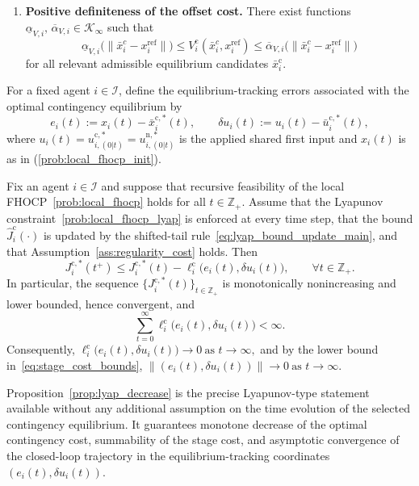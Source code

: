 \documentclass[twocolumn]{autart}
\begin{document}
\begin{assumption}
\begin{enumerate}
    \item \textbf{Positive definiteness of the offset cost.}
    There exist functions
    \(
    \underline{\alpha}_{V,i},\,\overline{\alpha}_{V,i}\in\mathcal K_\infty
    \)
    such that
    \[
    \underline{\alpha}_{V,i}\!\bigl(\|\bar{x}_i^c- x_i^{\mathrm{ref}}\|\bigr)
    \le
    V_i^{\mathrm c}(\bar{x}_i^c,x_i^{\mathrm{ref}})
    \le
    \overline{\alpha}_{V,i}\!\bigl(\|\bar{x}_i^c- x_i^{\mathrm{ref}}\|\bigr)
    \]
    for all relevant admissible equilibrium candidates $\bar x_i^{\mathrm c}$.
\end{enumerate}
\end{assumption}
For a fixed agent \(i\in\mathcal I\), define the equilibrium-tracking
errors associated with the optimal contingency equilibrium by
\[
e_i(t):=x_i(t)-\bar x_i^{\mathrm c,\ast}(t),
\qquad
\delta u_i(t):=u_i(t)-\bar u_i^{\mathrm c,\ast}(t),
\]
where
\(
u_i(t)=u_{i,(0|t)}^{\mathrm c,\ast}
      =u_{i,(0|t)}^{\mathrm n,\ast}
\)
is the applied shared first input and $x_i(t)$ is as in (\ref{prob:local_fhocp_init}).
\begin{proposition}%
\label{prop:lyap_decrease}
Fix an agent \(i\in\mathcal I\) and suppose that recursive feasibility of
the local FHOCP~\eqref{prob:local_fhocp} holds for all
\(t\in\mathbb Z_+\). Assume that the Lyapunov
constraint~\eqref{prob:local_fhocp_lyap} is enforced at every time step,
that the bound \(\hat J_i^{\mathrm c}(\cdot)\) is updated by the
shifted-tail rule~\eqref{eq:lyap_bound_update_main}, and that
Assumption~\ref{ass:regularity_cost} holds. Then
\begin{equation}
J_i^{\mathrm c,\ast}(t^+)
\le
J_i^{\mathrm c,\ast}(t)
-
\ell_i^{\mathrm c}\!\bigl(e_i(t),\delta u_i(t)\bigr),
\qquad \forall t\in\mathbb Z_+.
\label{eq:lyap_decrease_main}
\end{equation}
In particular, the sequence $\{J_i^{\mathrm c,\ast}(t)\}_{t\in\mathbb Z_+}$ is monotonically nonincreasing and lower bounded, hence convergent, and
\begin{equation}
\sum_{t=0}^{\infty}
\ell_i^{\mathrm c}\!\bigl(e_i(t),\delta u_i(t)\bigr)
<\infty.
\label{eq:summable_stage_main}
\end{equation}
Consequently,
\(
\ell_i^{\mathrm c}\!\bigl(e_i(t),\delta u_i(t)\bigr)\to 0
\ \text{as } t\to\infty,
\)
and by the lower bound in~\eqref{eq:stage_cost_bounds},
\(
\|(e_i(t),\delta u_i(t))\|\to 0
\ \text{as } t\to\infty.
\)
\end{proposition}
\begin{remark}
\label{rem:prop_lyap_interpretation}
Proposition~\ref{prop:lyap_decrease} is the precise Lyapunov-type statement available without any additional assumption on the time evolution of the selected contingency equilibrium.
It guarantees monotone decrease of the optimal contingency cost, summability of the stage cost, and asymptotic convergence of the closed-loop trajectory in the equilibrium-tracking coordinates $(e_i(t),\delta u_i(t))$.
\end{remark}
\end{document}
